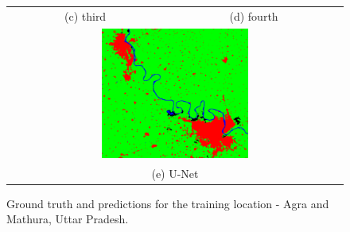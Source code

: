 \documentclass[12pt, a4paper]{report}
\begin{document}
\begin{figure}
\begin{center}
\begin{tabular}{cc}
(c) third & (d) fourth \\[6pt]
\multicolumn{2}{c}{\includegraphics[width=0.45\textwidth]{train_cnn} }\\
\multicolumn{2}{c}{(e) U-Net}
\end{tabular}
\caption{Ground truth and predictions for the training location - Agra and Mathura, Uttar Pradesh.}
\end{center}
\end{figure}
\end{document}
